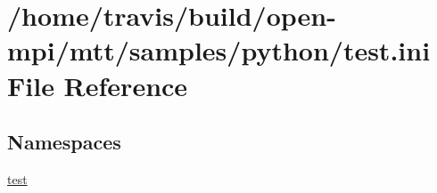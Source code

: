 \hypertarget{test_8ini}{\section{/home/travis/build/open-\/mpi/mtt/samples/python/test.ini File Reference}
\label{test_8ini}
}
\subsection*{Namespaces}
\begin{DoxyCompactItemize}
\item 
\hyperlink{namespacetest}{test}
\end{DoxyCompactItemize}
